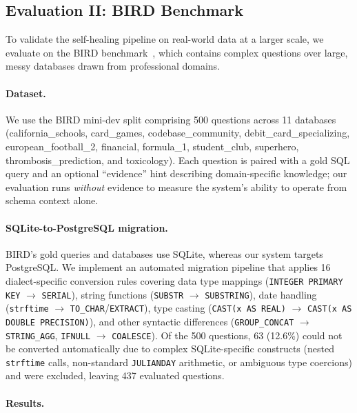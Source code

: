 \documentclass{article}
\begin{document}
\subsection{Evaluation II: BIRD Benchmark}
\label{sec:eval_bird}

To validate the self-healing pipeline on real-world data at a larger scale, we evaluate on the BIRD benchmark~\citep{li2024bird}, which contains complex questions over large, messy databases drawn from professional domains.

\paragraph{Dataset.} We use the BIRD mini-dev split comprising 500 questions across 11 databases (california\_schools, card\_games, codebase\_community, debit\_card\_specializing, european\_football\_2, financial, formula\_1, student\_club, superhero, thrombosis\_prediction, and toxicology). Each question is paired with a gold SQL query and an optional ``evidence'' hint describing domain-specific knowledge; our evaluation runs \emph{without} evidence to measure the system's ability to operate from schema context alone.

\paragraph{SQLite-to-PostgreSQL migration.} BIRD's gold queries and databases use SQLite, whereas our system targets PostgreSQL. We implement an automated migration pipeline that applies 16 dialect-specific conversion rules covering data type mappings (\texttt{INTEGER PRIMARY KEY} $\to$ \texttt{SERIAL}), string functions (\texttt{SUBSTR} $\to$ \texttt{SUBSTRING}), date handling (\texttt{strftime} $\to$ \texttt{TO\_CHAR}/\texttt{EXTRACT}), type casting (\texttt{CAST(x AS REAL)} $\to$ \texttt{CAST(x AS DOUBLE PRECISION)}), and other syntactic differences (\texttt{GROUP\_CONCAT} $\to$ \texttt{STRING\_AGG}, \texttt{IFNULL} $\to$ \texttt{COALESCE}). Of the 500 questions, 63 (12.6\%) could not be converted automatically due to complex SQLite-specific constructs (nested \texttt{strftime} calls, non-standard \texttt{JULIANDAY} arithmetic, or ambiguous type coercions) and were excluded, leaving 437 evaluated questions.

\paragraph{Results.}
\end{document}

